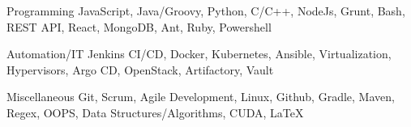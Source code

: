 

\begin{cvskills}

  \cvskill
    {Programming} %
    {JavaScript, Java/Groovy, Python, C/C++, NodeJs, Grunt, Bash, REST API, React, MongoDB, Ant, Ruby, Powershell} %

  \cvskill
    {Automation/IT} %
    {Jenkins CI/CD, Docker, Kubernetes, Ansible, Virtualization, Hypervisors, Argo CD, OpenStack, Artifactory, Vault} %

  \cvskill
    {Miscellaneous} %
    {Git, Scrum, Agile Development, Linux, Github, Gradle, Maven, Regex, OOPS, Data Structures/Algorithms, CUDA, \LaTeX} %

\end{cvskills}

\vspace{-1mm}
